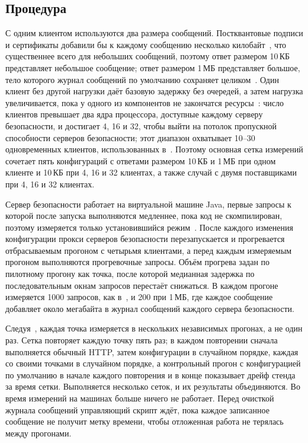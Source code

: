 \documentclass[conference,a4paper]{IEEEtran}
\begin{document}
\subsection{Процедура}\label{sec:proc}

С одним клиентом используются два размера сообщений. Постквантовые подписи и сертификаты добавили бы
к каждому сообщению несколько килобайт~\cite{snetkov2023}, что существеннее всего для небольших сообщений, поэтому
ответ размером 10\,КБ представляет небольшое сообщение; ответ размером 1\,МБ представляет большое, тело которого журнал сообщений по
умолчанию сохраняет целиком~\cite{xroadsyspar}. Один клиент без другой нагрузки даёт базовую задержку без
очередей, а затем нагрузка увеличивается, пока у одного из компонентов не закончатся
ресурсы~\cite{taklai2020}: число клиентов превышает два ядра процессора, доступные каждому
серверу безопасности, и достигает 4, 16 и 32, чтобы выйти на потолок пропускной способности серверов безопасности; этот
диапазон охватывает 10--30 одновременных клиентов, использованных в~\cite{taklai2020}. Поэтому основная сетка измерений сочетает пять конфигураций с ответами размером 10\,КБ и 1\,МБ
при одном клиенте и 10\,КБ при 4, 16 и 32 клиентах, а также случай с двумя поставщиками при 4, 16 и 32 клиентах.

Сервер безопасности работает на виртуальной машине Java, первые запросы к которой после запуска выполняются медленнее,
пока код не скомпилирован, поэтому измеряется только установившийся режим~\cite{georges2007}. После каждого
изменения конфигурации прокси серверов безопасности перезапускается и прогревается отбрасываемым прогоном с четырьмя
клиентами, а перед каждым измеряемым прогоном выполняются прогревочные запросы. Объём прогрева задан по
пилотному прогону как точка, после которой медианная задержка по последовательным окнам запросов перестаёт
снижаться. В каждом прогоне измеряется 1000 запросов, как в~\cite{bakhtina2026ijis}, и 200 при 1\,МБ, где
каждое сообщение добавляет около мегабайта в журнал сообщений каждого сервера безопасности.

Следуя~\cite{georges2007}, каждая точка измеряется в нескольких независимых прогонах, а не один раз.
Сетка повторяет каждую точку пять раз; в каждом повторении сначала выполняется обычный HTTP, затем
конфигурации в случайном порядке, каждая со своими точками в случайном порядке, а контрольный прогон с конфигурацией
по умолчанию в начале каждого повторения и в конце показывает дрейф стенда за время
сетки. Выполняется несколько сеток, и их результаты объединяются. Во время измерений на машинах больше ничего не работает. Перед очисткой журнала сообщений
управляющий скрипт ждёт, пока каждое записанное сообщение не получит метку времени, чтобы отложенная работа не терялась
между прогонами.
\end{document}

